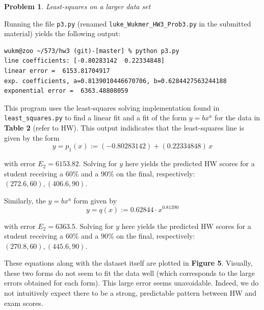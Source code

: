 \documentclass[10pt]{article}
\theoremstyle{plain}
\theoremstyle{definition}
\newtheorem{prob}{Problem}
\numberwithin{equation}{section}
\begin{document}
\begin{prob} \textit{Least-squares on a larger data set}

    Running the file \texttt{p3.py} (renamed \texttt{luke\_Wukmer\_HW3\_Prob3.py} in the submitted material)
    yields the following output:
\begin{verbatim}
wukm@zoo ~/573/hw3 (git)-[master] % python p3.py
line coefficients: [-0.80283142  0.22334848]
linear error =  6153.81704917
exp. coefficients, a=0.8139010446670706, b=0.6284427563244188
exponential error =  6363.48808059
\end{verbatim}

This program uses the least-squares solving implementation found in 
\texttt{least\_squares.py} to find a linear fit and a fit of the form
$y=bx^a$ for the data in \textbf{Table 2} (refer to HW).
This output indidicates that the least-squares line is given by the form
    \[
            y = p_1(x) := (-0.80283142) + (0.22334848)\,x
    \]

with error $E_2 = 6153.82$. Solving for $y$ here yields the predicted HW scores for
a student receiving a $60\%$ and a $90\%$ on the final, respectively:
$(272.6,60), (406.6,90)$.

Similarly, the $y=bx^a$ form given by
    \[
            y = q(x) := 0.62844 \cdot x^{0.81390}
        \]

with error $E_2 = 6363.5$. Solving for $y$ here yields the predicted HW scores for
a student receiving a $60\%$ and a $90\%$ on the final, respectively:
$(270.8,60), (445.6,90)$.

These equations along with the dataset itself are plotted in \textbf{Figure 5}.
Visually, these two forms do not seem to fit the data well
(which corresponds to the large errors obtained for each form).
This large error seems unavoidable. Indeed, we do not intuitively expect there to be a strong,
predictable pattern between HW and exam scores.

\end{prob}

\hrulefill
\end{document}
